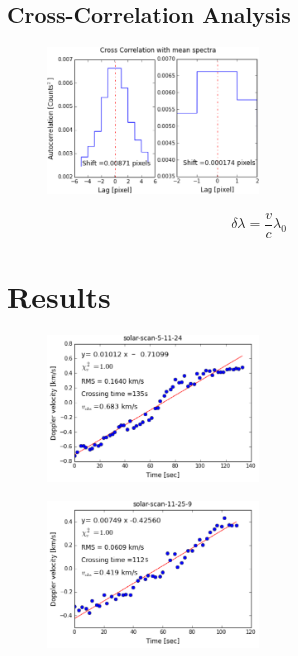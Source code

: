 \documentclass[authoryear, 12pt,5p, times]{elsarticle}
\begin{document}
\subsection{Cross-Correlation Analysis}
\begin{figure}[h!]
\includegraphics[width=0.5\textwidth]{figures/autocorr_curve}
\caption{}
\label{autocorr_curve}
\end{figure}
\begin{equation}
\delta\lambda=\frac{v}{c}\lambda_0
\label{doppler_eq}
\end{equation}
\section{Results}
\begin{figure}[h!]
\includegraphics[width=0.5\textwidth]{figures/long_cord_dv}
\caption{}
\label{long_cord_dv}
\end{figure}
\begin{figure}[h!]
\includegraphics[width=0.5\textwidth]{figures/short_cord_dv}
\caption{}
\label{short_cord_dv}
\end{figure}
\end{document}
